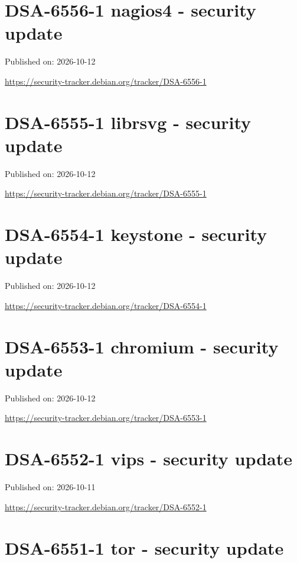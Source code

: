 \documentclass[11pt,a4paper]{article}
\begin{document}
\section{DSA-6556-1 nagios4 - security update}

Published on: 2026-10-12

\href{https://security-tracker.debian.org/tracker/DSA-6556-1}{https://security-tracker.debian.org/tracker/DSA-6556-1}

\section{DSA-6555-1 librsvg - security update}

Published on: 2026-10-12

\href{https://security-tracker.debian.org/tracker/DSA-6555-1}{https://security-tracker.debian.org/tracker/DSA-6555-1}

\section{DSA-6554-1 keystone - security update}

Published on: 2026-10-12

\href{https://security-tracker.debian.org/tracker/DSA-6554-1}{https://security-tracker.debian.org/tracker/DSA-6554-1}

\section{DSA-6553-1 chromium - security update}

Published on: 2026-10-12

\href{https://security-tracker.debian.org/tracker/DSA-6553-1}{https://security-tracker.debian.org/tracker/DSA-6553-1}

\section{DSA-6552-1 vips - security update}

Published on: 2026-10-11

\href{https://security-tracker.debian.org/tracker/DSA-6552-1}{https://security-tracker.debian.org/tracker/DSA-6552-1}

\section{DSA-6551-1 tor - security update}
\end{document}
